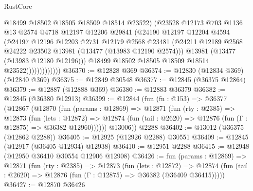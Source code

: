 \begin{lexlean}{RustCore}
\begin{coremodule}
                            @18499
                            @18502
                            @18505
                            @18509
                            @18514
                            @23522)
                          (@23528
                            @12173
                            @703
                            @1136
                            @13
                            @2574
                            @4718
                            @12197
                            @12206
                            @29841
                            (@24190
                              @12197
                              @12204
                              @4594
                              (@24197
                                @12196
                                @12203
                                @2731
                                @12179
                                @2568
                                @23481
                                (@24211
                                  @12189
                                  @2568
                                  @24222
                                  @23502
                                  @13981
                                  (@13477 (@13983 @12190 @2574)))
                                @13981
                                (@13477 (@13983 @12180 @12196)))
                              @18499
                              @18502
                              @18505
                              @18509
                              @18514
                              @23522)))))))))))))
@36370 := @12828 @369
@36374 := @12830 (@12834 @369) (@12840 @369)
@36375 := @12849 @30548
@36377 := @12845 (@36375 @12864)
@36379 := @12887 (@12888 @369)
@36380 := @12883 @36379
@36382 := @12845 (@36380 @12913)
@36399 := @12844
    (fun (fn : @153) =>
    @36377
      (@12867
        (@12870
          (fun (params : @12869) =>
          @12871
            (fun (rty : @2385) =>
            @12873
              (fun (lets : @12872) =>
              @12874 (fun (tail : @2620) => @12876 (fun (Γ : @12875) => @36382 @12960))))))
        @13006))
    @2288
@36402 := @13012 (@36375 (@12862 @2288))
@36405 := @12925 (@12926 @2288) @30551
@36409 := @12845 (@12917 (@36405 @12934) @12938)
@36410 := @12951 @2288
@36415 := @12948 (@12950 @36410 @30554 @12906 @12908)
@36426 := fun (params : @12869) =>
  @12871
    (fun (rty : @2385) =>
    @12873
      (fun (lets : @12872) =>
      @12874 (fun (tail : @2620) => @12876 (fun (Γ : @12875) => @36382 (@36409 @36415)))))
@36427 := @12870 @36426

\end{coremodule}
\end{lexlean}
